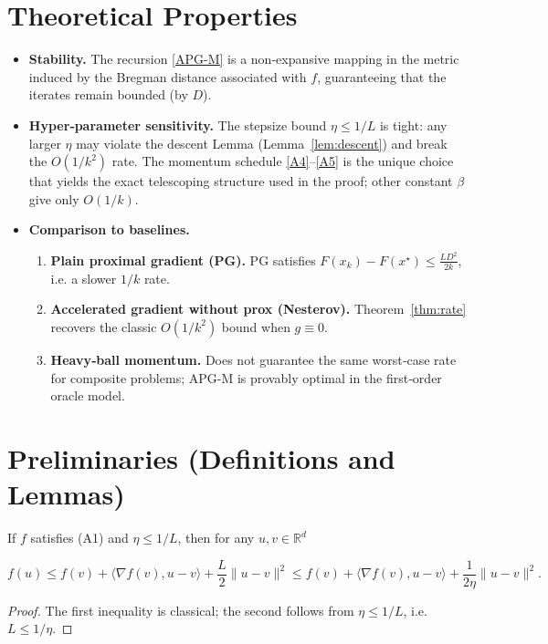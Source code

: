 \documentclass{article}
\begin{document}
\section*{Theoretical Properties}
\begin{itemize}
\item \textbf{Stability.} The recursion \eqref{APG-M} is a non‑expansive mapping
      in the metric induced by the Bregman distance associated with $f$,
      guaranteeing that the iterates remain bounded (by $D$).

\item \textbf{Hyper‑parameter sensitivity.}  
      The stepsize bound $\eta\le1/L$ is tight: any larger $\eta$ may violate the
      descent Lemma (Lemma~\ref{lem:descent}) and break the $O(1/k^{2})$ rate.  
      The momentum schedule \eqref{A4}–\eqref{A5} is the unique choice that
      yields the exact telescoping structure used in the proof; other
      constant $\beta$ give only $O(1/k)$.

\item \textbf{Comparison to baselines.}  
      \begin{enumerate}
        \item \textbf{Plain proximal gradient (PG).}  PG satisfies
              $F(x_{k})-F(x^{\star})\le \frac{L D^{2}}{2k}$, i.e. a slower $1/k$ rate.
        \item \textbf{Accelerated gradient without prox (Nesterov).}  Theorem~\ref{thm:rate}
              recovers the classic $O(1/k^{2})$ bound when $g\equiv0$.
        \item \textbf{Heavy‑ball momentum.}  Does not guarantee the same worst‑case
              rate for composite problems; APG-M is provably optimal in the
              first‑order oracle model.
      \end{enumerate}
\end{itemize}

\section*{Preliminaries (Definitions and Lemmas)}
\begin{lemma}\label{lem:descent}
If $f$ satisfies (A1) and $\eta\le 1/L$, then for any $u,v\in\mathbb R^{d}$  

\[
f(u)\le f(v)+\langle\nabla f(v),u-v\rangle+\frac{L}{2}\|u-v\|^{2}
\le f(v)+\langle\nabla f(v),u-v\rangle+\frac{1}{2\eta}\|u-v\|^{2}.
\tag{L1}
\]
\end{lemma}
\begin{proof}
The first inequality is classical; the second follows from $\eta\le1/L$,
i.e. $L\le 1/\eta$.
\end{proof}
\end{document}
